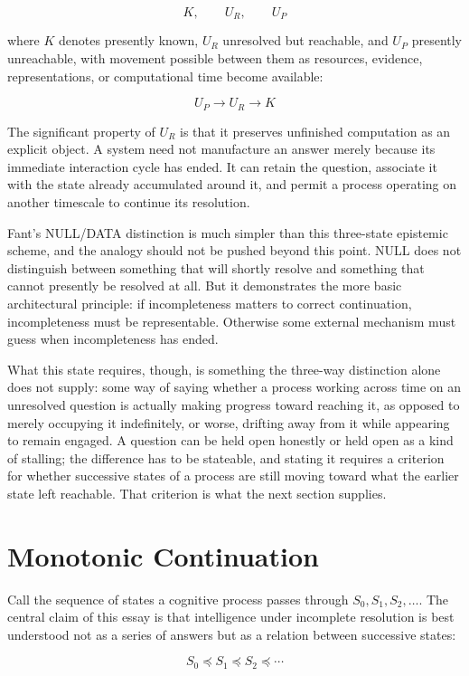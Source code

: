 \documentclass[11pt]{article}
\begin{document}
\[
K, \qquad U_R, \qquad U_P
\]

where $K$ denotes presently known, $U_R$ unresolved but reachable, and $U_P$ presently unreachable, with movement possible between them as resources, evidence, representations, or computational time become available:

\[
U_P \to U_R \to K
\]

The significant property of $U_R$ is that it preserves unfinished computation as an explicit object. A system need not manufacture an answer merely because its immediate interaction cycle has ended. It can retain the question, associate it with the state already accumulated around it, and permit a process operating on another timescale to continue its resolution.

Fant's NULL/DATA distinction is much simpler than this three-state epistemic scheme, and the analogy should not be pushed beyond this point. NULL does not distinguish between something that will shortly resolve and something that cannot presently be resolved at all. But it demonstrates the more basic architectural principle: if incompleteness matters to correct continuation, incompleteness must be representable. Otherwise some external mechanism must guess when incompleteness has ended.

What this state requires, though, is something the three-way distinction alone does not supply: some way of saying whether a process working across time on an unresolved question is actually making progress toward reaching it, as opposed to merely occupying it indefinitely, or worse, drifting away from it while appearing to remain engaged. A question can be held open honestly or held open as a kind of stalling; the difference has to be stateable, and stating it requires a criterion for whether successive states of a process are still moving toward what the earlier state left reachable. That criterion is what the next section supplies.

\section{Monotonic Continuation}

Call the sequence of states a cognitive process passes through $S_0, S_1, S_2, \ldots$. The central claim of this essay is that intelligence under incomplete resolution is best understood not as a series of answers but as a relation between successive states:

\[
S_0 \preceq S_1 \preceq S_2 \preceq \cdots
\]
\end{document}
